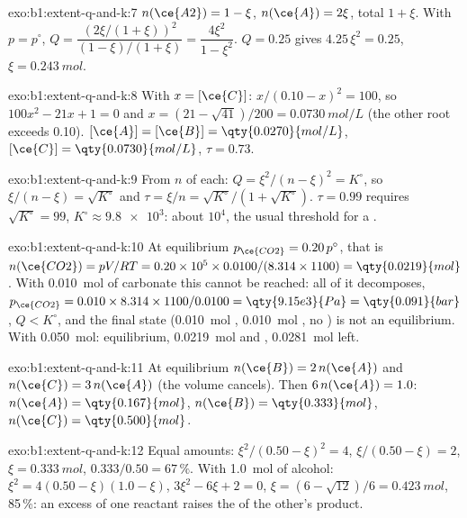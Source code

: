 \begin{solution}{exo:b1:extent-q-and-k:7}
$n(\ce{A2}) = 1 - \xi$, $n(\ce{A}) = 2\xi$, total $1 + \xi$. With $p =
p^\circ$, $Q = \dfrac{(2\xi/(1+\xi))^2}{(1-\xi)/(1+\xi)} = \dfrac{4\xi^2}{1 -
\xi^2}$. $Q = 0.25$ gives $4.25\,\xi^2 = 0.25$, $\xi = \qty{0.243}{mol}$.
\end{solution}

\begin{solution}{exo:b1:extent-q-and-k:8}
With $x = [\ce{C}]$: $x/(0.10 - x)^2 = 100$, so $100x^2 - 21x + 1 = 0$ and
$x = (21 - \sqrt{41})/200 = \qty{0.0730}{mol/L}$ (the other root exceeds
0.10). $[\ce{A}] = [\ce{B}] = \qty{0.0270}{mol/L}$, $[\ce{C}] =
\qty{0.0730}{mol/L}$, $\tau = 0.73$.
\end{solution}

\begin{solution}{exo:b1:extent-q-and-k:9}
From $n$ of each: $Q = \xi^2/(n - \xi)^2 = K^\circ$, so $\xi/(n - \xi) =
\sqrt{K^\circ}$ and $\tau = \xi/n = \sqrt{K^\circ}/(1 + \sqrt{K^\circ})$.
$\tau = 0.99$ requires $\sqrt{K^\circ} = 99$, $K^\circ \approx \num{9.8e3}$:
about $10^4$, the usual threshold for a .
\end{solution}

\begin{solution}{exo:b1:extent-q-and-k:10}
At equilibrium $p_{\ce{CO2}} = 0.20\,p^\circ$, that is $n(\ce{CO2}) =
pV/RT = 0.20 \times 10^5 \times 0.0100/(8.314 \times 1100) =
\qty{0.0219}{mol}$. With \qty{0.010}{mol} of carbonate this cannot be
reached: all of it decomposes, $p_{\ce{CO2}} = 0.010 \times 8.314 \times
1100/0.0100 = \qty{9.15e3}{Pa} = \qty{0.091}{bar}$, $Q < K^\circ$, and the
final state (\qty{0.010}{mol} , \qty{0.010}{mol} , no
) is not an equilibrium. With \qty{0.050}{mol}: equilibrium,
\qty{0.0219}{mol}  and , \qty{0.0281}{mol}  left.
\end{solution}

\begin{solution}{exo:b1:extent-q-and-k:11}
At equilibrium $n(\ce{B}) = 2\,n(\ce{A})$ and $n(\ce{C}) = 3\,n(\ce{A})$
(the volume cancels). Then $6\,n(\ce{A}) = 1.0$: $n(\ce{A}) =
\qty{0.167}{mol}$, $n(\ce{B}) = \qty{0.333}{mol}$, $n(\ce{C}) =
\qty{0.500}{mol}$.
\end{solution}

\begin{solution}{exo:b1:extent-q-and-k:12}
Equal amounts: $\xi^2/(0.50 - \xi)^2 = 4$, $\xi/(0.50 - \xi) = 2$,
$\xi = \qty{0.333}{mol}$,  $0.333/0.50 = 67\,\%$. With \qty{1.0}{mol}
of alcohol: $\xi^2 = 4(0.50 - \xi)(1.0 - \xi)$, $3\xi^2 - 6\xi + 2 = 0$,
$\xi = (6 - \sqrt{12})/6 = \qty{0.423}{mol}$,  85\,\%: an excess of
one reactant raises the  of the other's product.
\end{solution}

